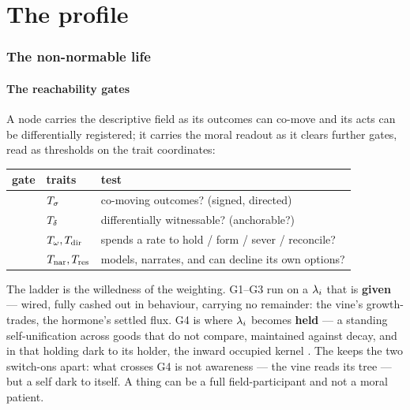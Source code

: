 \documentclass[../main]{subfiles}
\begin{document}
\clearpage
\part{The profile}

\section{The non-normable life}
\label{sec:nonnormable}
\setcounter{subsection}{-1}%

\subsection{The reachability gates}
\label{subsec:prof:gates}
%
%
A node carries the descriptive field as its outcomes can co-move and its acts can be
differentially registered; it carries the moral readout as it clears further gates, read as
thresholds on the trait coordinates:
\begin{table}[htbp]
  \centering
  \begin{tabularx}{\textwidth}{@{} l l >{\hsize}L @{}}
    \toprule \textbf{gate} & \textbf{traits} & \textbf{test} \\ \midrule
     & $T\sb{\sigma}$         & co-moving outcomes? (signed, directed) \\
     & $T\sb{\delta}$         & differentially witnessable? (anchorable?) \\
     & $T\sb{\omega},T\sb{\mathrm{dir}}$ & spends a rate to hold / form / sever / reconcile? \\
     & $T\sb{\mathrm{nar}},T\sb{\mathrm{res}}$  & models, narrates, and can decline its own options? \\
    \bottomrule
  \end{tabularx}
\end{table}
The ladder is the willedness of the weighting. G1--G3 run on a $\lambda\sb{i}$ that is
\textbf{given} --- wired, fully cashed out in behaviour, carrying no remainder: the vine's
growth-trades, the hormone's settled flux. G4 is where $\lambda\sb{i}$ becomes \textbf{held}
--- a standing self-unification across goods that do not compare, maintained against decay,
and in that holding dark to its holder, the inward occupied kernel . The
 keeps the two switch-ons apart: what crosses G4 is not awareness --- the vine
reads its tree --- but a self dark to itself. A thing can be a full field-participant and not
a moral patient.
\end{document}
